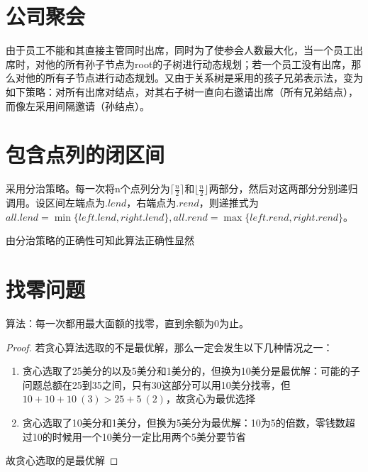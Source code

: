 \documentclass[]{report}
\begin{document}
	\section{公司聚会}
	由于员工不能和其直接主管同时出席，同时为了使参会人数最大化，当一个员工出席时，对他的所有孙子节点为root的子树进行动态规划；若一个员工没有出席，那么对他的所有子节点进行动态规划。又由于关系树是采用的孩子兄弟表示法，变为如下策略：对所有出席对结点，对其右子树一直向右邀请出席（所有兄弟结点），而像左采用间隔邀请（孙结点）。
	\section{包含点列的闭区间}
	采用分治策略。每一次将n个点列分为$\lceil\frac{n}{2}\rceil$和$\lfloor\frac{n}{2}\rfloor$两部分，然后对这两部分分别递归调用。设区间左端点为$.lend$，右端点为$.rend$，则递推式为$all.lend = \min\{left.lend, right.lend\}, all.rend=\max\{left.rend, right.rend\}$。\par
	由分治策略的正确性可知此算法正确性显然
	\section{找零问题}
	算法：每一次都用最大面额的找零，直到余额为0为止。\par
	\begin{proof}
		若贪心算法选取的不是最优解，那么一定会发生以下几种情况之一：
		\begin{enumerate}
			\item 贪心选取了25美分的以及5美分和1美分的，但换为10美分是最优解：可能的子问题总额在25到35之间，只有30这部分可以用10美分找零，但$10+10+10\ (3)>25+5\ (2)$，故贪心为最优选择
			\item 贪心选取了10美分和1美分，但换为5美分为最优解：10为5的倍数，零钱数超过10的时候用一个10美分一定比用两个5美分要节省
		\end{enumerate}
		故贪心选取的是最优解
	\end{proof}
\end{document}
